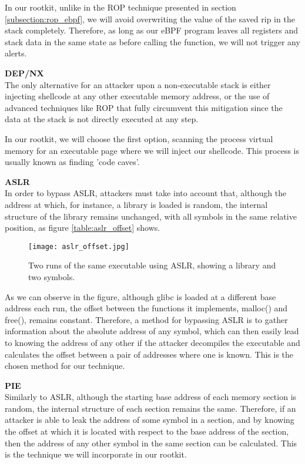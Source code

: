 In our rootkit, unlike in the ROP technique presented in section \ref{subsection:rop_ebpf}, we will avoid overwriting the value of the saved rip in the stack completely. Therefore, as long as our eBPF program leaves all registers and stack data in the same state as before calling the function, we will not trigger any alerts.

\textbf{DEP/NX}\\
The only alternative for an attacker upon a non-executable stack is either injecting shellcode at any other executable memory address, or the use of advanced techniques like ROP that fully circumvent this mitigation since the data at the stack is not directly executed at any step.

In our rootkit, we will choose the first option, scanning the process virtual memory for an executable page where we will inject our shellcode. This process is usually known as finding 'code caves'.

\textbf{ASLR}\\
In order to bypass ASLR, attackers must take into account that, although the address at which, for instance, a library is loaded is random, the internal structure of the library remains unchanged, with all symbols in the same relative position, as figure \ref{table:aslr_offset} shows.

\begin{figure}[H]
	\centering
	\texttt{[image: aslr\_offset.jpg]}
	\caption{Two runs of the same executable using ASLR, showing a library and two symbols.}
	\label{fig:alsr_offset}
\end{figure}

As we can observe in the figure, although glibc is loaded at a different base address each run, the offset between the functions it implements, malloc() and free(), remains constant. Therefore, a method for bypassing ASLR is to gather information about the absolute address of any symbol, which can then easily lead to knowing the address of any other if the attacker decompiles the executable and calculates the offset between a pair of addresses where one is known. This is the chosen method for our technique.

\textbf{PIE}\\
Similarly to ASLR, although the starting base address of each memory section is random, the internal structure of each section remains the same. Therefore, if an attacker is able to leak the address of some symbol in a section, and by knowing the offset at which it is located with respect to the base address of the section, then the address of any other symbol in the same section can be calculated\cite{pie_exploit}. This is the technique we will incorporate in our rootkit.

